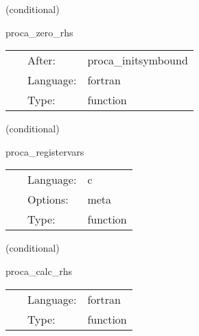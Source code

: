   (conditional) 

\hspace{5mm} proca\_zero\_rhs 

\hspace{5mm}{\it set all rhs functions to zero to prevent spurious nans } 


\hspace{5mm}

 \begin{tabular*}{160mm}{cll} 
~ & After:  & proca\_initsymbound \\ 
~ & Language:  & fortran \\ 
~ & Type:  & function \\ 
\end{tabular*} 


\vspace{5mm}

   (conditional) 

\hspace{5mm} proca\_registervars 

\hspace{5mm}{\it register variables for mol } 


\hspace{5mm}

 \begin{tabular*}{160mm}{cll} 
~ & Language:  & c \\ 
~ & Options:  & meta \\ 
~ & Type:  & function \\ 
\end{tabular*} 


\vspace{5mm}

   (conditional) 

\hspace{5mm} proca\_calc\_rhs 

\hspace{5mm}{\it mol rhs calculation for proca variables } 


\hspace{5mm}

 \begin{tabular*}{160mm}{cll} 
~ & Language:  & fortran \\ 
~ & Type:  & function \\ 
\end{tabular*} 


\vspace{5mm}

